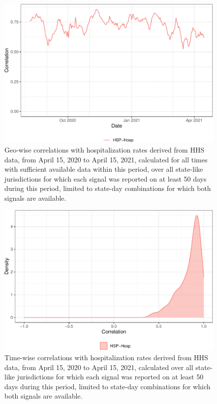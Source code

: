 \documentclass[9pt,twoside,lineno]{pnas-new}
\begin{document}
\begin{figure}

{\centering \includegraphics[width=\textwidth]{fig/hosp-correlations-by-time-1} 

}

\caption{Geo-wise correlations with hospitalization rates derived from HHS data, from April 15, 2020 to April 15, 2021, calculated for all times with sufficient available data within this period, over all state-like jurisdictions for which each signal was reported on at least 50 days during this period, limited to state-day combinations for which both signals are available.}\label{fig:hosp-correlations-by-time}
\end{figure}

\begin{figure}

{\centering \includegraphics[width=\textwidth]{fig/hosp-correlations-by-state-1} 

}

\caption{Time-wise correlations with hospitalization rates derived from HHS data, from April 15, 2020 to April 15, 2021, calculated over all state-like jurisdictions for which each signal was reported on at least 50 days during this period, limited to state-day combinations for which both signals are available.}\label{fig:hosp-correlations-by-state}
\end{figure}

\FloatBarrier







\end{document}
